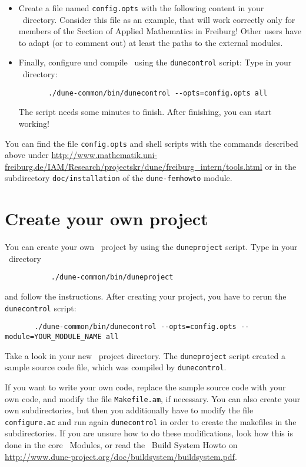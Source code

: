 \begin{itemize}
\item Create a file named \lstinline!config.opts! with the following content in your \Dune\ directory. Consider this file as an example, that will work correctly only for members of the Section of Applied Mathematics in Freiburg! Other users have to adapt (or to comment out) at least the paths to the external modules.

  \begin{lst} \label{config.opts} \mbox{}
    
  \end{lst}

\item Finally, configure und compile \Dune\ using the \lstinline!dunecontrol! script: Type in your \Dune\ directory:
\begin{lstlisting}
       ./dune-common/bin/dunecontrol --opts=config.opts all
\end{lstlisting}

   The script needs some minutes to finish. After finishing, you can start working!
\end{itemize}


You can find the file \texttt{config.opts} and shell scripts with the commands described above under
\url{http://www.mathematik.uni-freiburg.de/IAM/Research/projectskr/dune/freiburg_intern/tools.html}
or in the subdirectory \texttt{doc/installation} of the \texttt{dune-femhowto} module.




\section{Create your own project}
You can create your own \Dune\ project by using the \lstinline!duneproject! script. Type in your \Dune\ directory
\begin{lstlisting}
           ./dune-common/bin/duneproject
\end{lstlisting}
and follow the instructions. After creating your project, you have to rerun the \lstinline!dunecontrol! script:
\begin{lstlisting}
       ./dune-common/bin/dunecontrol --opts=config.opts --module=YOUR_MODULE_NAME all
\end{lstlisting}
Take a look in your new \Dune\ project directory. The \lstinline!duneproject! script created a sample source code file, which was compiled by \lstinline!dunecontrol!.

If you want to write your own code, replace the sample source code with your own code, and modify the file
\lstinline!Makefile.am!, if necessary. You can also create your own subdirectories, but then you additionally have to
modify the file \lstinline!configure.ac! and run again \lstinline!dunecontrol! in order to create the makefiles in the subdirectories.
If you are unsure how to do these modifications, look how this is done in the core \Dune\ Modules,
or read the \Dune\ Build System Howto on \url{http://www.dune-project.org/doc/buildsystem/buildsystem.pdf}.



